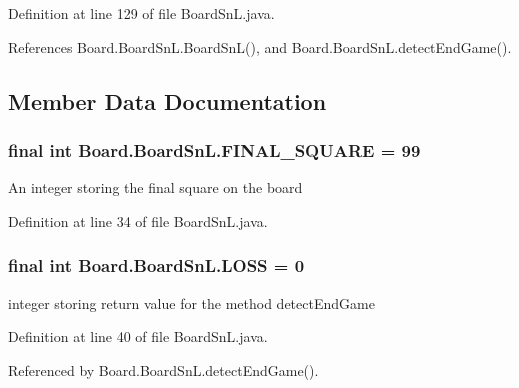 Definition at line 129 of file Board\+Sn\+L.\+java.



References Board.\+Board\+Sn\+L.\+Board\+Sn\+L(), and Board.\+Board\+Sn\+L.\+detect\+End\+Game().



\subsection{Member Data Documentation}
\hypertarget{class_board_1_1_board_sn_l_a133b0d6726fc954ea12a66b4369e3fa6}{}
\subsubsection[{F\+I\+N\+A\+L\+\_\+\+S\+Q\+U\+A\+R\+E}]{\setlength{\rightskip}{0pt plus 5cm}final int Board.\+Board\+Sn\+L.\+F\+I\+N\+A\+L\+\_\+\+S\+Q\+U\+A\+R\+E = 99\hspace{0.3cm}{\ttfamily [private]}}\label{class_board_1_1_board_sn_l_a133b0d6726fc954ea12a66b4369e3fa6}
An integer storing the final square on the board 

Definition at line 34 of file Board\+Sn\+L.\+java.

\hypertarget{class_board_1_1_board_sn_l_aa6138411eddcd92ae999cff9fc34acb7}{}
\subsubsection[{L\+O\+S\+S}]{\setlength{\rightskip}{0pt plus 5cm}final int Board.\+Board\+Sn\+L.\+L\+O\+S\+S = 0\hspace{0.3cm}{\ttfamily [private]}}\label{class_board_1_1_board_sn_l_aa6138411eddcd92ae999cff9fc34acb7}
integer storing return value for the method detect\+End\+Game 

Definition at line 40 of file Board\+Sn\+L.\+java.



Referenced by Board.\+Board\+Sn\+L.\+detect\+End\+Game().

\hypertarget{class_board_1_1_board_sn_l_a98423adeb63e796de2d496689b4ce8e1}{}
